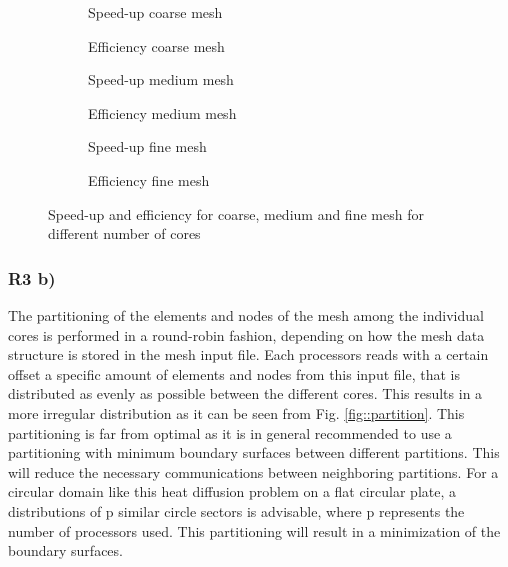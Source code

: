 \documentclass[a4paper, 11pt, oneside]{scrartcl}
\newcommand{\refFig}[1]{Fig. \ref{#1}}
\begin{document}
\begin{figure}[h!]
	\centering
	\begin{subfigure}{0.49\textwidth}
		\centering
		\resizebox{0.5\width}{!}{}
		\caption{\label{fig::SPcoarseMPI} Speed-up coarse mesh}
	\end{subfigure}
	\hfill
	\begin{subfigure}{0.49\textwidth}
		\centering
		\resizebox{0.5\width}{!}{}
		\caption{\label{fig::EffcoarseMPI} Efficiency coarse mesh}
	\end{subfigure}
	\hfill
	\begin{subfigure}{0.49\textwidth}
		\centering
		\resizebox{0.5\width}{!}{}
		\caption{\label{fig::SPmediumMPI} Speed-up medium mesh}
	\end{subfigure}
	\hfill
	\begin{subfigure}{0.49\textwidth}
		\centering
		\resizebox{0.5\width}{!}{}
		\caption{\label{fig::EffmediumMPI} Efficiency medium mesh}
	\end{subfigure}
	\hfill
	\begin{subfigure}{0.49\textwidth}
		\centering
		\resizebox{0.5\width}{!}{}
		\caption{\label{fig::SPfineMPI} Speed-up fine mesh}
	\end{subfigure}
	\hfill
	\begin{subfigure}{0.49\textwidth}
		\centering
		\resizebox{0.5\width}{!}{}
		\caption{\label{fig::EfffineMPI} Efficiency fine mesh}
	\end{subfigure}
	\caption{\label{fig::MPI} Speed-up and efficiency for coarse, medium and fine mesh for different number of cores}
\end{figure}
\clearpage

\subsubsection{R3 b) \label{sec:partitioning}}

The partitioning of the elements and nodes of the mesh among the individual cores is performed in a round-robin fashion, depending on how the mesh data structure is stored in the mesh input file. Each processors reads with a certain offset a specific amount of elements and nodes from this input file, that is distributed as evenly as possible between the different cores. This results in a more irregular distribution as it can be seen from \refFig{fig::partition}. This partitioning is far from optimal as it is in general recommended to use a partitioning with minimum boundary surfaces between different partitions. This will reduce the necessary communications between neighboring partitions. For a circular domain like this heat diffusion problem on a flat circular plate, a distributions of p similar circle sectors is advisable, where p represents the number of processors used. This partitioning will result in a minimization of the boundary surfaces.
\end{document}
